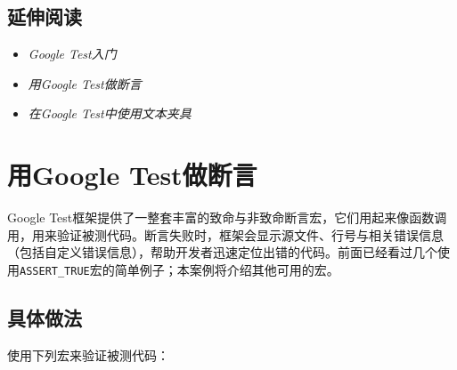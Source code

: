 
\subsection{延伸阅读}



\begin{itemize}
\item \textit{Google Test入门}



\item \textit{用Google Test做断言}



\item \textit{在Google Test中使用文本夹具}

\end{itemize}


\section{用Google Test做断言}



Google Test框架提供了一整套丰富的致命与非致命断言宏，它们用起来像函数调用，用来验证被测代码。断言失败时，框架会显示源文件、行号与相关错误信息（包括自定义错误信息），帮助开发者迅速定位出错的代码。前面已经看过几个使用\texttt{ASSERT\_\allowbreak{}TRUE}宏的简单例子；本案例将介绍其他可用的宏。



\subsection{具体做法}



使用下列宏来验证被测代码：



